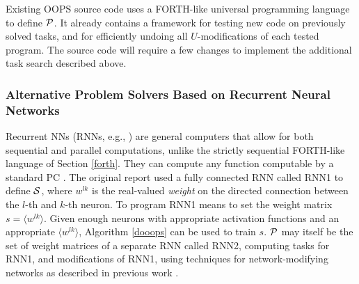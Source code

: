 \documentclass{article}
\begin{document}
Existing OOPS source code
\cite{Schmidhuber:04oopscode} uses a FORTH-like universal programming language
to define $\cal P$. It already contains a framework for testing new code on
previously solved tasks, and for efficiently undoing all $U$-modifications of each tested program. 
The source code will require a few changes to 
implement  the additional task search described above.


\subsubsection{Alternative Problem Solvers Based on Recurrent Neural Networks}
\label{rnn}

Recurrent NNs (RNNs, e.g., \cite{Werbos:88gasmarket,WilliamsZipser:92,RobinsonFallside:87tr,Schmidhuber:92ncn3,Hochreiter:97lstm})
are general computers that allow for both sequential
and parallel computations, unlike the strictly sequential FORTH-like language of Section \ref{forth}. 
They can compute any function computable by a standard PC \cite{Schmidhuber:90thesis}.
The original report \cite{Schmidhuber:11powerplay}
used a fully connected RNN called RNN1 to define $\cal S$, where
$w^{lk}$ is the real-valued {\em weight} on the directed connection
between the $l$-th and $k$-th neuron. To program RNN1 means to set the weight matrix $s = \langle w^{lk} \rangle$.
Given enough neurons with appropriate activation functions and an appropriate $\langle w^{lk} \rangle$,
 Algorithm \ref{dooops} can be used to train $s$. $\cal P$ may itself be the set of
weight matrices of a separate RNN called RNN2, computing tasks for RNN1, 
and modifications of RNN1, using techniques for network-modifying networks
as described in previous work \cite{Schmidhuber:92ncfastweights,Schmidhuber:93selfreficann,Schmidhuber:93ratioicann}.
\end{document}
